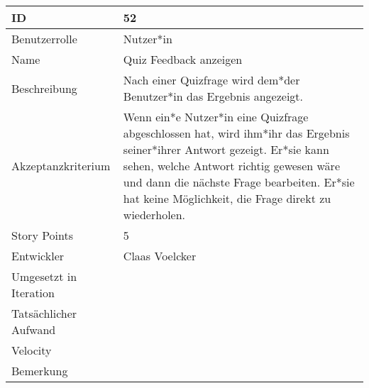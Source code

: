 \begin{tabularx}{\textwidth}{|p{}|X|}
	\hline
	ID & 52\\
	\hline
	Benutzerrolle & Nutzer*in\\
	\hline
	Name & Quiz Feedback anzeigen\\
	\hline
	Beschreibung & Nach einer Quizfrage wird dem*der Benutzer*in das Ergebnis angezeigt.\\
	\hline
	Akzeptanzkriterium & Wenn ein*e Nutzer*in eine Quizfrage abgeschlossen hat, wird ihm*ihr das Ergebnis seiner*ihrer Antwort gezeigt. Er*sie kann sehen, welche Antwort richtig gewesen wäre und dann die nächste Frage bearbeiten. Er*sie hat keine Möglichkeit, die Frage direkt zu wiederholen. \\
	\hline
	Story Points & 5\\
	\hline
	Entwickler & Claas Voelcker\\
	\hline
	Umgesetzt in Iteration & \\
	\hline
	Tatsächlicher Aufwand & \\
	\hline
	Velocity & \\
	\hline
	Bemerkung & \\
	\hline
\end{tabularx}
\vspace{20pt}
